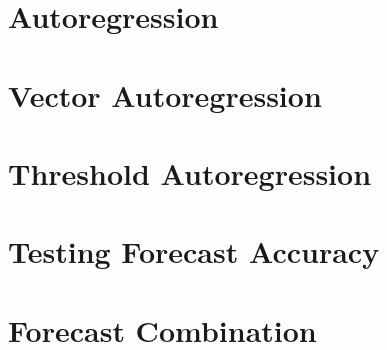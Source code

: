 \documentclass{tufte-book}
\begin{document}
	
	\chapter{Autoregression}
	\label{c6}
	
	
	\chapter{Vector Autoregression}
	\label{c7}
	
	
	\chapter{Threshold Autoregression}
	\label{c8}
	
	
	\chapter{Testing Forecast Accuracy}
	\label{c9}
	
	
	\chapter{Forecast Combination}
	\label{c10}
	
	
	
	
	\backmatter
	
	
	
	
	
	\printindex
\end{document}
